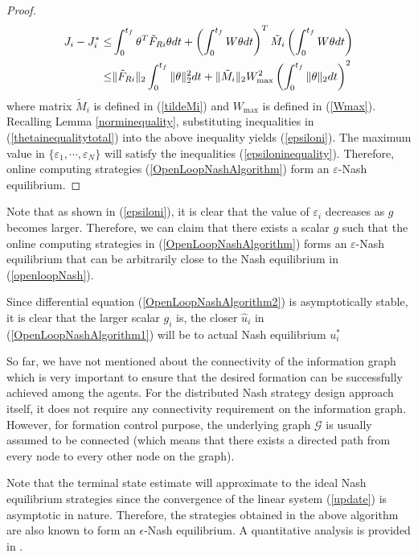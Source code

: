 \documentclass[10pt,doublecolumn]{IEEEtran}  %
\begin{document}
\begin{proof}
\begin{align*}
J_i-J_i^*\leq&\int^{t_f}_0
\theta^T \tilde{F}_{Ri}\theta\mbox{d}t +\left(\int^{t_f}_0W\theta\mbox{d}t\right)^T \tilde{M}_i
\left(\int^{t_f}_0W\theta\mbox{d}t\right)\notag\\
\leq&\|\tilde{F}_{Ri}\|_2\int^{t_f}_0
\|\theta\|_2^2\mbox{d}t+\|\tilde{M}_i\|_2 W^2_{\max} \left(\int^{t_f}_0\|\theta\|_2\mbox{d}t\right)^2
\end{align*}
where matrix $\tilde{M}_i$ is defined in (\ref{tildeMi}) and $W_{\max}$ is defined in (\ref{Wmax}). Recalling Lemma \ref{norminequality}, substituting inequalities in (\ref{thetainequalitytotal}) into the above inequality yields (\ref{epsiloni}). The maximum value in $\{\varepsilon_1,\cdots,\varepsilon_N\}$ will satisfy the inequalities (\ref{epsiloninequality}). Therefore, online computing strategies (\ref{OpenLoopNashAlgorithm}) form an $\varepsilon$-Nash equilibrium.
\end{proof}


Note that as shown in (\ref{epsiloni}), it is clear that the value of
$\varepsilon_i$ decreases as $g$ becomes larger. Therefore, we can claim that
there exists a scalar $g$ such that the online computing strategies in
(\ref{OpenLoopNashAlgorithm}) forms an $\varepsilon$-Nash equilibrium that can
be arbitrarily close to the Nash equilibrium in (\ref{openloopNash}).



Since differential equation (\ref{OpenLoopNashAlgorithm2})
is asymptotically stable, it is clear that the larger scalar $g_i$ is, the closer $\hat{u}_i$ in  (\ref{OpenLoopNashAlgorithm1}) will be to actual Nash equilibrium $u^*_i$










\begin{Rmk}
So far, we have not mentioned about the connectivity of the information graph which is very important to ensure that the desired formation can be successfully achieved among the agents. For the distributed Nash strategy design approach itself, it does not require any connectivity requirement on the information graph. However, for formation control purpose, the underlying graph $\mathcal{G}$ is usually assumed to be connected (which means that there exists a directed path from every node to every other node on the graph).
\end{Rmk}

{Note that the terminal state estimate will approximate to the ideal Nash equilibrium strategies since the convergence of the linear system (\ref{update}) is asymptotic in nature. Therefore, the strategies obtained in the above algorithm are also known to form an $\epsilon$-Nash equilibrium. A quantitative analysis is provided in \cite{LinThesis}.}
\end{document}
